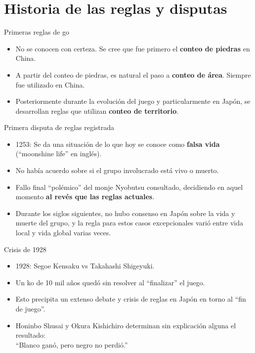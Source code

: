 \documentclass{beamer}
\begin{document}
\section{Historia de las reglas y disputas}

\begin{frame}{Primeras reglas de go}
  
  \begin{itemize}
    \item No se conocen con certeza. Se cree que fue primero el \textbf{conteo de piedras} en China. 
    \item A partir del conteo de piedras, es natural el paso a \textbf{conteo de área}. Siempre fue utilizado en China.
    \item Posteriormente durante la evolución del juego y particularmente en Japón, se desarrollan reglas que utilizan \textbf{conteo de territorio}.
  \end{itemize}
  
\end{frame}

\begin{frame}{Primera disputa de reglas registrada}
  
  \begin{itemize}
    \item 1253: Se da una situación de lo que hoy se conoce como \textbf{falsa vida} (``moonshine life'' en inglés).
    \item No había acuerdo sobre si el grupo involucrado está vivo o muerto.
    \item Fallo final ``polémico'' del monje Nyobutsu consultado, decidiendo en aquel momento \textbf{al revés que las reglas actuales}.
    \item Durante los siglos siguientes, no hubo consenso en Japón sobre la vida y muerte del grupo, y la regla para estos casos excepcionales
    varió entre vida local y vida global varias veces.
    
  \end{itemize}
  
\end{frame}

\begin{frame}{Crisis de 1928}
  \begin{itemize}
    \item 1928: Segoe Kensaku vs Takahashi Shigeyuki.
    \item Un ko de 10 mil años quedó sin resolver al ``finalizar'' el juego.
    \item Esto precipita un extenso debate y crisis de reglas en Japón en torno al ``fin de juego''.
    \item Honinbo Shusai y Okura Kishichiro determinan sin explicación alguna el resultado: \\
          ``Blanco ganó, pero negro no perdió.''
  \end{itemize}

\end{frame}
\end{document}
